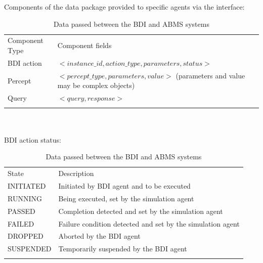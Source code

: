 \begin{table}[h]
Components of the data package provided to specific agents via the
interface:\\ 
\begin{tabular}{ @{}p{} | p{}@{}}
\hline\noalign{\smallskip}
{Component Type} & {Component fields}\\
\noalign{\smallskip}\hline\noalign{\smallskip}
{BDI action} & $<instance\_id, action\_type, parameters, status>$  \\
{Percept} & $<percept\_type, parameters, value>$
(parameters and value may be complex objects) \\
{Query} & $<query, response>$ \\
\noalign{\smallskip}\hline
\end{tabular}

~\\~\\BDI action status:\\
\begin{tabular}{ @{}p{} | p{}@{}}
\hline\noalign{\smallskip}
{State} & {Description}\\
\noalign{\smallskip}\hline\noalign{\smallskip}
INITIATED & Initiated by BDI agent and to be executed\\
RUNNING & Being executed, set by the simulation agent\\
PASSED & Completion detected and set by the simulation agent \\
FAILED & Failure condition detected and set by the simulation agent \\
DROPPED & Aborted by the BDI agent \\
SUSPENDED & Temporarily suspended by the BDI agent  \\
\noalign{\smallskip}\hline
\end{tabular}
\caption{Data passed between the BDI and ABMS systems} 
\label{interfacedata}
\end{table}


